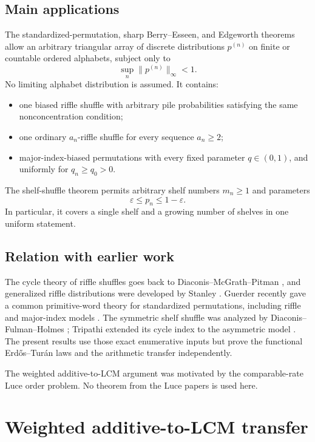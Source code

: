 \documentclass[11pt]{article}
\theoremstyle{definition}
\theoremstyle{remark}
\newcommand{\eps}{\varepsilon}
\begin{document}
\subsection*{Main applications}

The standardized-permutation, sharp Berry--Esseen, and Edgeworth theorems allow an arbitrary triangular array
of discrete distributions $p^{(n)}$ on finite or countable ordered
alphabets, subject only to
\[
 \sup_n\|p^{(n)}\|_\infty<1.
\]
No limiting alphabet distribution is assumed.  It contains:

\begin{itemize}[leftmargin=2em]
\item one biased riffle shuffle with arbitrary pile probabilities satisfying
the same nonconcentration condition;
\item one ordinary $a_n$-riffle shuffle for every sequence $a_n\ge2$;
\item major-index-biased permutations with every fixed parameter
$q\in(0,1)$, and uniformly for $q_n\ge q_0>0$.
\end{itemize}

The shelf-shuffle theorem permits arbitrary shelf numbers $m_n\ge1$ and
parameters
\[
 \eps\le p_n\le1-\eps.
\]
In particular, it covers a single shelf and a growing number of shelves in
one uniform statement.

\subsection*{Relation with earlier work}

The cycle theory of riffle shuffles goes back to
Diaconis--McGrath--Pitman \cite{DiaconisMcGrathPitman1995}, and generalized
riffle distributions were developed by Stanley \cite{Stanley2001}.
Guerder recently gave a common primitive-word theory for standardized
permutations, including riffle and major-index models
\cite{Guerder2026}.  The symmetric shelf shuffle was analyzed by
Diaconis--Fulman--Holmes \cite{DiaconisFulmanHolmes2013}; Tripathi extended
its cycle index to the asymmetric model \cite{Tripathi2026}.  The present
results use those exact enumerative inputs but prove the functional
Erd\H{o}s--Tur\'an laws and the arithmetic transfer independently.

The weighted additive-to-LCM argument was motivated by the comparable-rate
Luce order problem.  No theorem from the Luce papers is used here.

\section{Weighted additive-to-LCM transfer}
\end{document}
